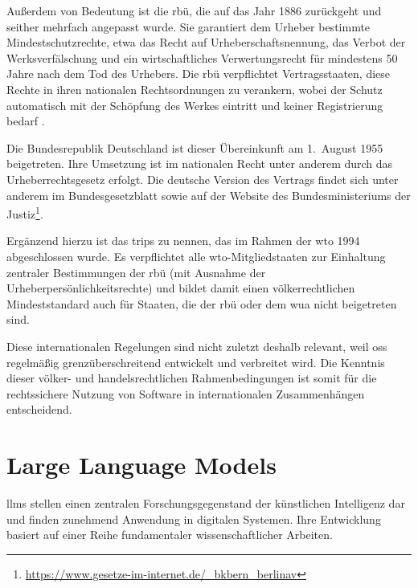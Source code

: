 Außerdem von Bedeutung ist die \gls{rbü}, die auf das Jahr 1886 zurückgeht und seither mehrfach angepasst wurde.
Sie garantiert dem Urheber bestimmte Mindestschutzrechte, etwa das Recht auf Urheberschaftsnennung, das Verbot der Werksverfälschung und ein wirtschaftliches Verwertungsrecht für mindestens 50 Jahre nach dem Tod des Urhebers.
Die \gls{rbü} verpflichtet Vertragsstaaten, diese Rechte in ihren nationalen Rechtsordnungen zu verankern, wobei der Schutz automatisch mit der Schöpfung des Werkes eintritt und keiner Registrierung bedarf \autocite{meckel_definition_nodate-1}.

Die Bundesrepublik Deutschland ist dieser Übereinkunft am 1.\ August 1955 beigetreten.
Ihre Umsetzung ist im nationalen Recht unter anderem durch das Urheberrechtsgesetz erfolgt.
Die deutsche Version des Vertrags findet sich unter anderem im Bundesgesetzblatt sowie auf der Website des Bundesministeriums der Justiz\footnote{\url{https://www.gesetze-im-internet.de/\_bkbern\_berlinav}}.

Ergänzend hierzu ist das \gls{trips} zu nennen, das im Rahmen der \gls{wto} 1994 abgeschlossen wurde.
Es verpflichtet alle \gls{wto}-Mitgliedstaaten zur Einhaltung zentraler Bestimmungen der \gls{rbü} (mit Ausnahme der Urheberpersönlichkeitsrechte) und bildet damit einen völkerrechtlichen Mindeststandard auch für Staaten, die der \gls{rbü} oder dem \gls{wua} nicht beigetreten sind\autocite{malbon_standards_2014}.

Diese internationalen Regelungen sind nicht zuletzt deshalb relevant, weil \gls{oss} regelmäßig grenzüberschreitend entwickelt und verbreitet wird.
Die Kenntnis dieser völker- und handelsrechtlichen Rahmenbedingungen ist somit für die rechtssichere Nutzung von Software in internationalen Zusammenhängen entscheidend.


\section{Large Language Models}

\glspl{llm} stellen einen zentralen Forschungsgegenstand der künstlichen Intelligenz dar und finden zunehmend Anwendung in digitalen Systemen.
Ihre Entwicklung basiert auf einer Reihe fundamentaler wissenschaftlicher Arbeiten.

